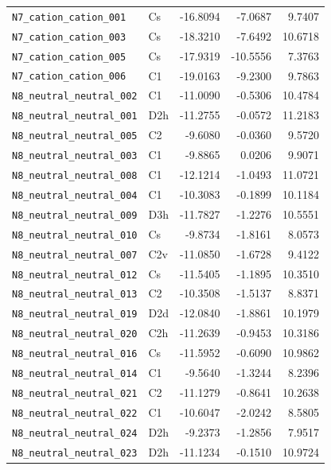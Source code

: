 {\begin{longtable}{@{}p{4.6cm}p{1.6cm}rrr@{}}
\texttt{N7\_cation\_cation\_001} & Cs & -16.8094 & -7.0687 & 9.7407 \\
\texttt{N7\_cation\_cation\_003} & Cs & -18.3210 & -7.6492 & 10.6718 \\
\texttt{N7\_cation\_cation\_005} & Cs & -17.9319 & -10.5556 & 7.3763 \\
\texttt{N7\_cation\_cation\_006} & C1 & -19.0163 & -9.2300 & 9.7863 \\
\addlinespace
\texttt{N8\_neutral\_neutral\_002} & C1 & -11.0090 & -0.5306 & 10.4784 \\
\texttt{N8\_neutral\_neutral\_001} & D2h & -11.2755 & -0.0572 & 11.2183 \\
\texttt{N8\_neutral\_neutral\_005} & C2 & -9.6080 & -0.0360 & 9.5720 \\
\texttt{N8\_neutral\_neutral\_003} & C1 & -9.8865 & 0.0206 & 9.9071 \\
\texttt{N8\_neutral\_neutral\_008} & C1 & -12.1214 & -1.0493 & 11.0721 \\
\texttt{N8\_neutral\_neutral\_004} & C1 & -10.3083 & -0.1899 & 10.1184 \\
\texttt{N8\_neutral\_neutral\_009} & D3h & -11.7827 & -1.2276 & 10.5551 \\
\texttt{N8\_neutral\_neutral\_010} & Cs & -9.8734 & -1.8161 & 8.0573 \\
\texttt{N8\_neutral\_neutral\_007} & C2v & -11.0850 & -1.6728 & 9.4122 \\
\texttt{N8\_neutral\_neutral\_012} & Cs & -11.5405 & -1.1895 & 10.3510 \\
\texttt{N8\_neutral\_neutral\_013} & C2 & -10.3508 & -1.5137 & 8.8371 \\
\texttt{N8\_neutral\_neutral\_019} & D2d & -12.0840 & -1.8861 & 10.1979 \\
\texttt{N8\_neutral\_neutral\_020} & C2h & -11.2639 & -0.9453 & 10.3186 \\
\texttt{N8\_neutral\_neutral\_016} & Cs & -11.5952 & -0.6090 & 10.9862 \\
\texttt{N8\_neutral\_neutral\_014} & C1 & -9.5640 & -1.3244 & 8.2396 \\
\texttt{N8\_neutral\_neutral\_021} & C2 & -11.1279 & -0.8641 & 10.2638 \\
\texttt{N8\_neutral\_neutral\_022} & C1 & -10.6047 & -2.0242 & 8.5805 \\
\texttt{N8\_neutral\_neutral\_024} & D2h & -9.2373 & -1.2856 & 7.9517 \\
\texttt{N8\_neutral\_neutral\_023} & D2h & -11.1234 & -0.1510 & 10.9724 \\

\end{longtable}}
